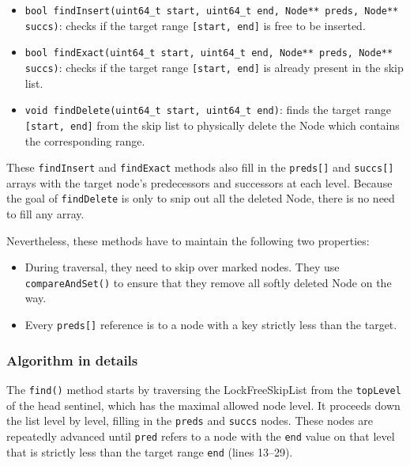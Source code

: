 \begin{itemize}
    \item \texttt{bool findInsert(uint64\_t start, uint64\_t end, Node** preds, Node** succs)}: checks if the target range \texttt{[start, end]} is free to be inserted.
    
    \item \texttt{bool findExact(uint64\_t start, uint64\_t end, Node** preds, Node** succs)}: checks if the target range \texttt{[start, end]} is already present in the skip list.
    
    \item \texttt{void findDelete(uint64\_t start, uint64\_t end)}: finds the target range \texttt{[start, end]} from the skip list to physically delete the Node which contains the corresponding range.
\end{itemize}

These \texttt{findInsert} and \texttt{findExact} methods also fill in the \texttt{preds[]} and \texttt{succs[]} arrays with the target node's predecessors and successors at each level.
Because the goal of \texttt{findDelete} is only to snip out all the deleted Node, there is no need to fill any array.

Nevertheless, these methods have to maintain the following two properties:

\begin{itemize}
    \item During traversal, they need to skip over marked nodes.
    They use \texttt{compareAndSet()} to ensure that they remove all softly deleted Node on the way.
    \item Every \texttt{preds[]} reference is to a node with a key strictly less than the target.
\end{itemize}

\vspace{15pt}

\begin{figure}[h]
    \centering
    
\end{figure}

\subsubsection{Algorithm in details}
The \texttt{find()} method starts by traversing the LockFreeSkipList from the \texttt{topLevel} of the head sentinel, which has the maximal allowed node level.
It proceeds down the list level by level, filling in the \texttt{preds} and \texttt{succs} nodes.
These nodes are repeatedly advanced until \texttt{pred} refers to a node with the \texttt{end} value on that level that is strictly less than the target range \texttt{end} (lines 13--29).


